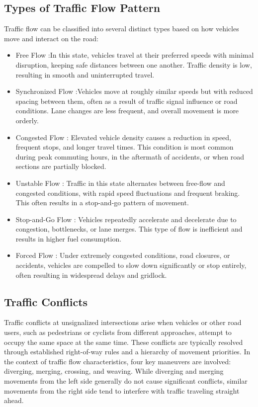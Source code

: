 \subsection{Types of Traffic Flow Pattern}
Traffic flow can be classified into several distinct types 
based on how vehicles move and interact on the road:

\begin{itemize}
    \item Free Flow :In this state, vehicles travel at their preferred speeds with minimal disruption, keeping safe distances between one another. Traffic density is low, resulting in smooth and uninterrupted travel.
    \item Synchronized Flow :Vehicles move at roughly similar speeds but with reduced spacing between them, often as a result of traffic signal influence or road conditions. Lane changes are less frequent, and overall movement is more orderly.
    \item Congested Flow : Elevated vehicle density causes a reduction in speed, frequent stops, and longer travel times. This condition is most common during peak commuting hours, in the aftermath of accidents, or when road sections are partially blocked.
    \item Unstable Flow : Traffic in this state alternates between free-flow and congested conditions, with rapid speed fluctuations and frequent braking. This often results in a stop-and-go pattern of movement.
    \item Stop-and-Go Flow : Vehicles repeatedly accelerate and decelerate due to congestion, bottlenecks, or lane merges. This type of flow is inefficient and results in higher fuel consumption.
    \item Forced Flow : Under extremely congested conditions, road closures, or accidents, vehicles are compelled to slow down significantly or stop entirely, often resulting in widespread delays and gridlock.
\end{itemize}

\subsection{Traffic Conflicts}

Traffic conflicts at unsignalized intersections arise when 
vehicles or other road users, such as pedestrians or cyclists 
from different approaches, attempt to occupy the same space 
at the same time. These conflicts are typically resolved 
through established right-of-way rules and a hierarchy of 
movement priorities. In the context of traffic flow 
characteristics, four key maneuvers are involved: diverging, 
merging, crossing, and weaving. While diverging and merging 
movements from the left side generally do not cause 
significant conflicts, similar movements from the right 
side tend to interfere with traffic traveling straight ahead.

